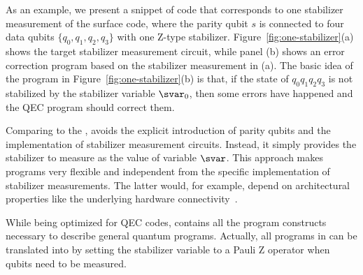 As an example, we present a snippet of {\langname} code that corresponds to  one stabilizer measurement of the surface code, where the parity qubit $s$ is connected to four data qubits $\{q_0,q_1,q_2,q_3\}$ with one Z-type stabilizer. Figure~\ref{fig:one-stabilizer}(a) shows the target stabilizer measurement circuit, while panel (b) shows an error correction program based on the stabilizer measurement in (a).  %
The basic idea of the program in Figure~\ref{fig:one-stabilizer}(b) is that, if the state of $q_0q_1q_2q_3$ is not stabilized by the stabilizer variable $\svar_0$, then some errors have happened and the QEC program should correct them.

Comparing to the \qwhilelang, {\langname} avoids the explicit introduction of parity qubits and the  implementation of stabilizer measurement circuits. Instead, it simply provides the stabilizer to measure as the value of variable $\svar$.
This approach makes {\langname} programs very flexible and independent from the specific implementation of stabilizer measurements. The latter would, for example, depend on architectural properties like the underlying hardware connectivity~\cite{Chamberland2020TopologicalAS}.

While being optimized for QEC codes, {\langname} contains all the program constructs necessary to describe general quantum programs. Actually, all programs in {\qwhilelang} can be translated into {\langname} by setting the stabilizer variable to a Pauli Z operator when qubits need to be measured.





